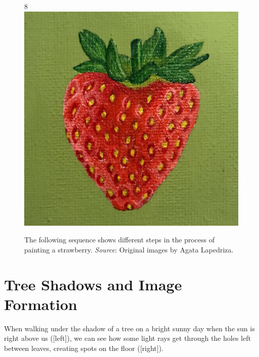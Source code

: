 \begin{figure}
{        8\includegraphics[width=.22\linewidth]{figures/visionscience/fresa_8.jpg} %
    }
    \caption{The following sequence shows different steps in the process of painting a strawberry. {\em Source}: Original images by Agata Lapedriza.}
    \label{fig:agata_painting}
\end{figure}






\section{Tree Shadows and Image Formation}

When walking under the shadow of a tree on a bright sunny day when the sun is right above us (\fig{\ref{fig:tree_pinholes}}[left]), we can see how some light rays get through the holes left between leaves, creating spots on the floor (\fig{\ref{fig:tree_pinholes}}[right]).


